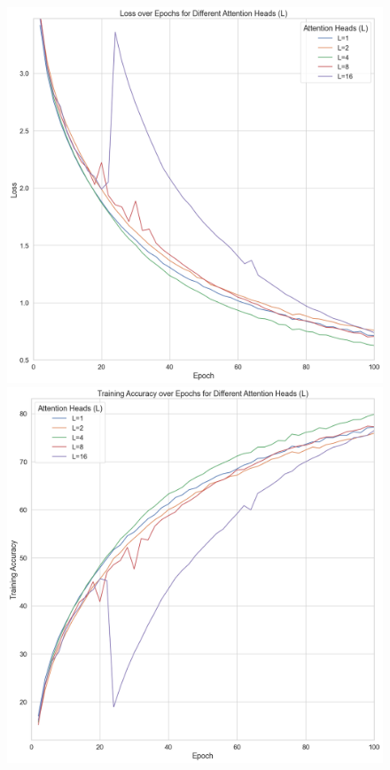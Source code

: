 \documentclass[10pt,twocolumn,letterpaper]{article}
\begin{document}
\begin{figure}[htbp]
   \centering
   \begin{minipage}[t]{0.33\textwidth}
      \centering
      \includegraphics[width=\textwidth]{Fig/3.png}
   \end{minipage}
   \begin{minipage}[t]{0.33\textwidth}
      \centering
      \includegraphics[width=\textwidth]{Fig/4.png}

\end{minipage}
\end{figure}
\end{document}
